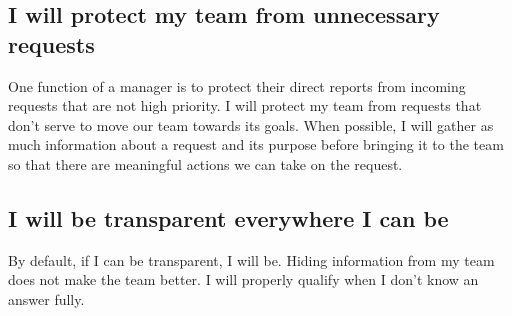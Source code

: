 \documentclass[11pt]{amsart}
\begin{document}
\subsection{I will protect my team from unnecessary requests}
One function of a manager is to protect their direct reports from incoming requests that are not high priority. I will protect my team from requests that don’t serve to move our team towards its goals. When possible, I will gather as much information about a request and its purpose before bringing it to the team so that there are meaningful actions we can take on the request.

\subsection{I will be transparent everywhere I can be}
By default, if I can be transparent, I will be. Hiding information from my team does not make the team better. I will properly qualify when I don’t know an answer fully.



\end{document}
